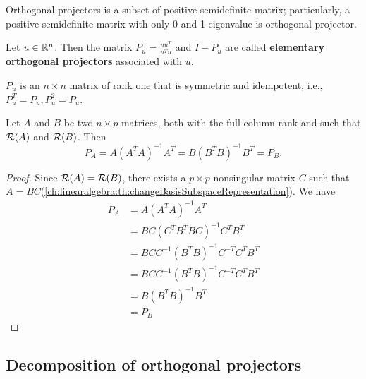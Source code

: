 \begin{refsection}
\begin{remark}
Orthogonal projectors is a subset of positive semidefinite matrix; particularly, a positive semidefinite matrix with only 0 and 1 eigenvalue is orthogonal projector. 		
\end{remark}


\begin{example} Let $u\in \mathbb{R}^n$. Then the matrix $P_u = \frac{uu^T}{u^Tu}$ and $I-P_u$ are called \textbf{elementary orthogonal projectors} associated with $u$.
	
$P_u$ is an $n\times n$ matrix of rank one that is symmetric and idempotent, i.e., $P_u^T = P_u, P_u^2 = P_u$.	
\end{example}

\begin{lemma} Let $A$ and $B$ be two $n\times p$ matrices, both with the full column rank and such that $\mathcal{R}(A)$ and $\mathcal{R}(B)$. Then 
	$$P_A = A(A^TA)^{-1}A^T = B(B^TB)^{-1}B^T=P_B.$$
\end{lemma}
\begin{proof}
Since $\mathcal{R}(A) = \mathcal{R}(B)$, there exists a $p\times p$ nonsingular matrix $C$ such that $A = BC$(\autoref{ch:linearalgebra:th:changeBasisSubspaceRepresentation}). 
We have
\begin{align*}
P_A &= A(A^TA)^{-1}A^T \\
&=BC(C^TB^TBC)^{-1}C^TB^T \\
&=BCC^{-1}(B^TB)^{-1}C^{-T}C^TB^T \\
&=BCC^{-1}(B^TB)^{-1}C^{-T}C^TB^T \\
&=B (B^TB)^{-1} B^T \\
&=P_B
\end{align*}
\end{proof}



\subsection{Decomposition of orthogonal projectors}


\end{refsection}
